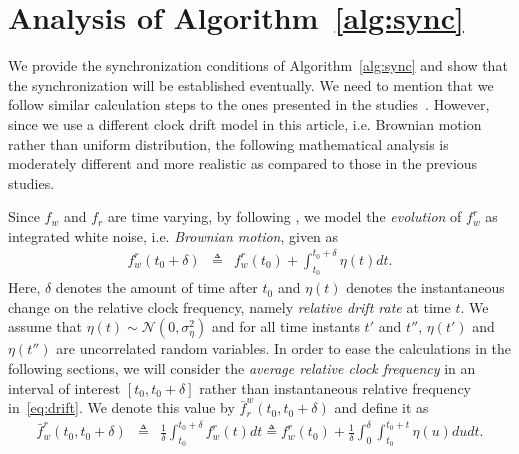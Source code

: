 \newpage\null\thispagestyle{empty}\newpage
\appendices
\section{Analysis of Algorithm~\ref{alg:sync}}

We provide the synchronization conditions of Algorithm~\ref{alg:sync} and show that the synchronization will be established eventually. We need to mention that we follow similar calculation steps to the ones presented in the studies~\cite{pi2015,Yildirim:Gradient:2016}. However, since we use a different clock drift model in this article, i.e. Brownian motion rather than uniform distribution, the following  mathematical analysis is moderately different and more realistic as compared to those in the previous studies. 

Since $f_w$ and $f_r$ are time varying, by following 
\cite{Zhong:2011:On-demand,Huang:2013:PSR}, we model the 
\emph{evolution} 
of $f_w^r$ as 
integrated white noise, i.e. \emph{Brownian motion}, given as
\begin{eqnarray}
f_{w}^{r}(t_{0}+\delta) & \triangleq & 
f_{w}^{r}(t_{0})+\int_{t_{0}}^{t_{0}+\delta}\eta(t)dt.\label{eq:drift}
\end{eqnarray}
Here, $\delta$ denotes the amount of time after $t_0$ and $\eta(t)$ denotes 
the instantaneous change on the relative clock frequency, namely 
\emph{relative drift rate} at time $t$. We assume that 
$\eta(t)\sim\mathcal{N}(0,\sigma_{\eta}^{2})$ and for all 
time instants $t'$ and $t''$, $\eta(t')$ and $\eta(t'')$ are uncorrelated 
random variables. In order to ease the calculations in the following sections, 
we will consider the \emph{average relative clock frequency} in an interval of 
interest $[t_0,t_0+\delta]$ rather than instantaneous relative frequency 
in~\eqref{eq:drift}. We denote this value by $\bar{f}_{r}^{w}(t_0,t_0+\delta)$ 
and define it as 
\begin{eqnarray}
\bar{f}_{w}^{r}(t_0,t_0\!+\!\delta) &\!\!\!\!\! \triangleq\!\!\!\!\! & 
\frac{1}{\delta}\!\!\int_{t_0}^{t_0+\delta}\!\!\!\!\!\!\!\!\!\!\!\! 
f_w^r(t)dt \triangleq
f_{w}^{r}(t_{0})\!+\!\frac{1}{\delta}\!\!\int_{0}^{\delta}\!\!\int_{t_{0}}^{t_{0}+t}\!\!\!\!\!\!\!\!\!\!\!\eta(u)dudt.
\label{eq:drift_relation}
\end{eqnarray}


